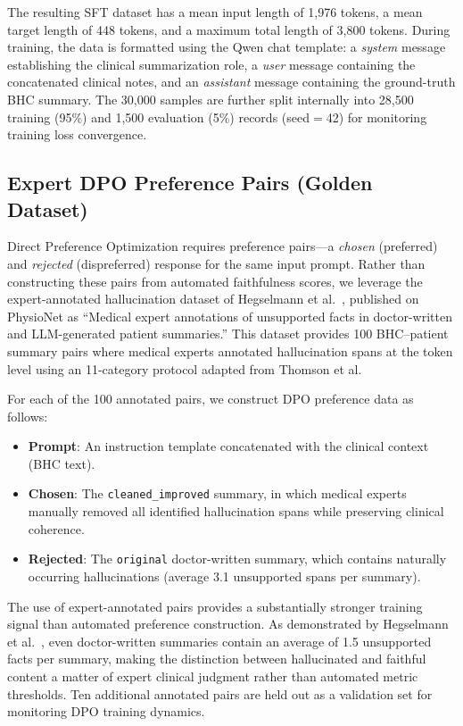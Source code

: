 \documentclass[12pt,a4paper,oneside]{report}
\begin{document}
The resulting SFT dataset has a mean input length of 1,976 tokens, a mean target length of 448 tokens, and a maximum total length of 3,800 tokens. During training, the data is formatted using the Qwen chat template: a \textit{system} message establishing the clinical summarization role, a \textit{user} message containing the concatenated clinical notes, and an \textit{assistant} message containing the ground-truth BHC summary. The 30,000 samples are further split internally into 28,500 training (95\%) and 1,500 evaluation (5\%) records (seed$=$42) for monitoring training loss convergence.


\subsection{Expert DPO Preference Pairs (Golden Dataset)}
\label{subsec:dpo-data}

Direct Preference Optimization requires preference pairs---a \textit{chosen} (preferred) and \textit{rejected} (dispreferred) response for the same input prompt. Rather than constructing these pairs from automated faithfulness scores, we leverage the expert-annotated hallucination dataset of Hegselmann et al.~\cite{hegselmann2024datacentric}, published on PhysioNet as ``Medical expert annotations of unsupported facts in doctor-written and LLM-generated patient summaries.'' This dataset provides 100 BHC--patient summary pairs where medical experts annotated hallucination spans at the token level using an 11-category protocol adapted from Thomson et al.

For each of the 100 annotated pairs, we construct DPO preference data as follows:
\begin{itemize}
    \item \textbf{Prompt}: An instruction template concatenated with the clinical context (BHC text).
    \item \textbf{Chosen}: The \texttt{cleaned\_improved} summary, in which medical experts manually removed all identified hallucination spans while preserving clinical coherence.
    \item \textbf{Rejected}: The \texttt{original} doctor-written summary, which contains naturally occurring hallucinations (average 3.1 unsupported spans per summary).
\end{itemize}

The use of expert-annotated pairs provides a substantially stronger training signal than automated preference construction. As demonstrated by Hegselmann et al.~\cite{hegselmann2024datacentric}, even doctor-written summaries contain an average of 1.5 unsupported facts per summary, making the distinction between hallucinated and faithful content a matter of expert clinical judgment rather than automated metric thresholds. Ten additional annotated pairs are held out as a validation set for monitoring DPO training dynamics.
\end{document}
